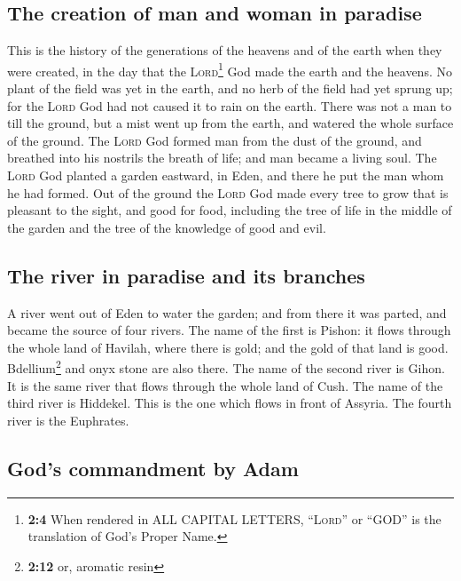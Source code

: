 \hypertarget{the-creation-of-man-and-woman-in-paradise}{%
\subsection{The creation of man and woman in
paradise}\label{the-creation-of-man-and-woman-in-paradise}}

 This is the history of the generations of the heavens and
of the earth when they were created, in the day that the
\textsc{Lord}\footnote{\textbf{2:4} When rendered in ALL CAPITAL
  LETTERS, ``\textsc{Lord}'' or ``GOD'' is the translation of God's
  Proper Name.} God made the earth and the heavens.  No
plant of the field was yet in the earth, and no herb of the field had
yet sprung up; for the \textsc{Lord} God had not caused it to rain on
the earth. There was not a man to till the ground,  but a
mist went up from the earth, and watered the whole surface of the
ground.  The \textsc{Lord} God formed man from the dust of
the ground, and breathed into his nostrils the breath of life; and man
became a living soul.  The \textsc{Lord} God planted a
garden eastward, in Eden, and there he put the man whom he had formed.
 Out of the ground the \textsc{Lord} God made every tree
to grow that is pleasant to the sight, and good for food, including the
tree of life in the middle of the garden and the tree of the knowledge
of good and evil.

\hypertarget{the-river-in-paradise-and-its-branches}{%
\subsection{The river in paradise and its
branches}\label{the-river-in-paradise-and-its-branches}}

 A river went out of Eden to water the garden; and from
there it was parted, and became the source of four rivers.
 The name of the first is Pishon: it flows through the
whole land of Havilah, where there is gold;  and the gold
of that land is good. Bdellium\footnote{\textbf{2:12} or, aromatic resin}
and onyx stone are also there.  The name of the second
river is Gihon. It is the same river that flows through the whole land
of Cush.  The name of the third river is Hiddekel. This
is the one which flows in front of Assyria. The fourth river is the
Euphrates.

\hypertarget{gods-commandment-by-adam}{%
\subsection{God's commandment by Adam}\label{gods-commandment-by-adam}}

